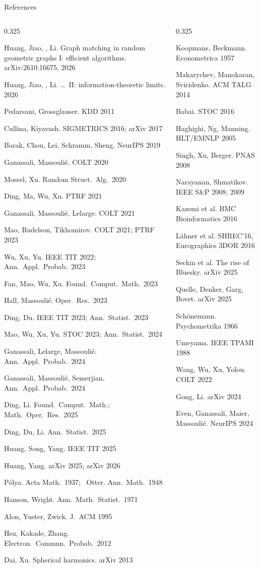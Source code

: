 \documentclass[aspectratio=169,10pt]{beamer}
\newcommand{\rh}[1]{\par\vspace{1.2mm}{\scriptsize\bfseries #1\par}\vspace{0.4mm}}
\newcommand{\rr}[1]{{\tiny #1\par}}
\begin{document}
\begin{frame}{References}
\vspace{-1mm}
\begin{columns}[T,onlytextwidth]
\begin{column}{0.325\textwidth}
\rh{\textcolor{titleblue}{This talk}}
\rr{Huang, Jiao, \me, Li. Graph matching in random geometric graphs I: efficient algorithms. arXiv:2610.16675, 2026}
\rr{Huang, Jiao, \me, Li. \dots\ II: information-theoretic limits. 2026}
\rh{\textcolor{titleblue}{Correlated \ER graphs}}
\rr{Pedarsani, Grossglauser. KDD 2011}
\rr{Cullina, Kiyavash. SIGMETRICS 2016; arXiv 2017}
\rr{Barak, Chou, Lei, Schramm, Sheng. NeurIPS 2019}
\rr{Ganassali, Massoulié. COLT 2020}
\rr{Mossel, Xu. Random Struct.\ Alg.\ 2020}
\rr{Ding, Ma, Wu, Xu. PTRF 2021}
\rr{Ganassali, Massoulié, Lelarge. COLT 2021}
\rr{Mao, Rudelson, Tikhomirov. COLT 2021; PTRF 2023}
\rr{Wu, Xu, Yu. IEEE TIT 2022; Ann.\ Appl.\ Probab.\ 2023}
\rr{Fan, Mao, Wu, Xu. Found.\ Comput.\ Math.\ 2023}
\rr{Hall, Massoulié. Oper.\ Res.\ 2023}
\rr{Ding, Du. IEEE TIT 2023; Ann.\ Statist.\ 2023}
\rr{Mao, Wu, Xu, Yu. STOC 2023; Ann.\ Statist.\ 2024}
\rr{Ganassali, Lelarge, Massoulié. Ann.\ Appl.\ Probab.\ 2024}
\rr{Ganassali, Massoulié, Semerjian. Ann.\ Appl.\ Probab.\ 2024}
\rr{Ding, Li. Found.\ Comput.\ Math.; Math.\ Oper.\ Res.\ 2025}
\rr{Ding, Du, Li. Ann.\ Statist.\ 2025}
\rr{Huang, Song, Yang. IEEE TIT 2025}
\rr{Huang, Yang. arXiv 2025; arXiv 2026}
\rh{\textcolor{titleblue}{Tools}}
\rr{Pólya. Acta Math.\ 1937; \ Otter. Ann.\ Math.\ 1948}
\rr{Hanson, Wright. Ann.\ Math.\ Statist.\ 1971}
\rr{Alon, Yuster, Zwick. J.\ ACM 1995}
\rr{Hsu, Kakade, Zhang. Electron.\ Commun.\ Probab.\ 2012}
\rr{Dai, Xu. Spherical harmonics. arXiv 2013}
\end{column}
\begin{column}{0.325\textwidth}
\rh{\textcolor{titleblue}{Worst case}}
\rr{Koopmans, Beckmann. Econometrica 1957}
\rr{Makarychev, Manokaran, Sviridenko. ACM TALG 2014}
\rr{Babai. STOC 2016}
\rh{\textcolor{titleblue}{Applications and data}}
\rr{Haghighi, Ng, Manning. HLT/EMNLP 2005}
\rr{Singh, Xu, Berger. PNAS 2008}
\rr{Narayanan, Shmatikov. IEEE S\&P 2008; 2009}
\rr{Kazemi et al. BMC Bioinformatics 2016}
\rr{Lähner et al. SHREC'16, Eurographics 3DOR 2016}
\rr{Seckin et al. The rise of Bluesky. arXiv 2025}
\rr{Quelle, Denker, Garg, Bovet. arXiv 2025}
\rh{\textcolor{titleblue}{Procrustes and geometric matching}}
\rr{Schönemann. Psychometrika 1966}
\rr{Umeyama. IEEE TPAMI 1988}
\rr{Wang, Wu, Xu, Yolou. COLT 2022}
\rr{Gong, Li. arXiv 2024}
\rr{Even, Ganassali, Maier, Massoulié. NeurIPS 2024}

\end{column}
\end{columns}
\end{frame}
\end{document}
